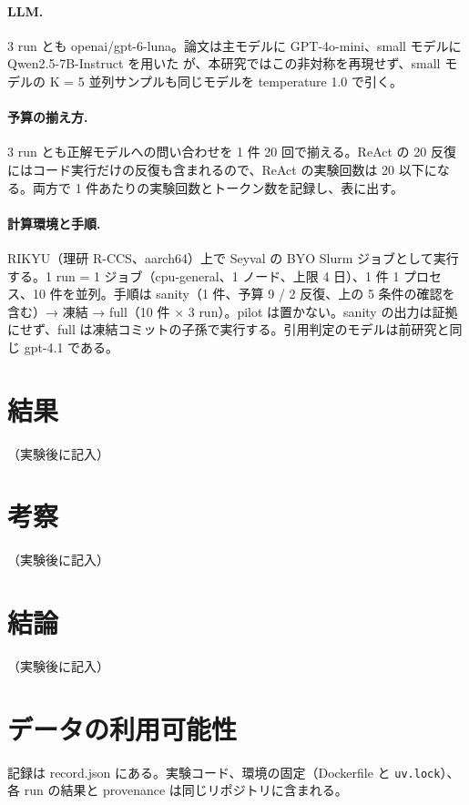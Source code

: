 \documentclass{article}
\providecommand{\airasrecordlink}[1]{#1}
\begin{document}
\paragraph{LLM.}
3 run とも openai/gpt-6-luna。論文は主モデルに GPT-4o-mini、small モデルに Qwen2.5-7B-Instruct を用いた \cite[s2.p4]{kabra-2026-llm} が、本研究ではこの非対称を再現せず、small モデルの K = 5 並列サンプルも同じモデルを temperature 1.0 \cite[s2.p13]{kabra-2026-llm} で引く。

\paragraph{予算の揃え方.}
3 run とも正解モデルへの問い合わせを 1 件 20 回で揃える。ReAct の 20 反復にはコード実行だけの反復も含まれるので、ReAct の実験回数は 20 以下になる。両方で 1 件あたりの実験回数とトークン数を記録し、表に出す。

\paragraph{計算環境と手順.}
RIKYU（理研 R-CCS、aarch64）上で Seyval の BYO Slurm ジョブとして実行する。1 run = 1 ジョブ（cpu-general、1 ノード、上限 4 日）、1 件 1 プロセス、10 件を並列。手順は sanity（1 件、予算 9 / 2 反復、上の 5 条件の確認を含む）→ 凍結 → full（10 件 × 3 run）。pilot は置かない。sanity の出力は証拠にせず、full は凍結コミットの子孫で実行する。引用判定のモデルは前研究と同じ gpt-4.1 である。


\section{結果}
\label{sec:results}
（実験後に記入）

\section{考察}
\label{sec:discussion}
（実験後に記入）

\section{結論}
\label{sec:conclusion}
（実験後に記入）

\section*{データの利用可能性}
記録は \airasrecordlink{record.json} にある。実験コード、環境の固定（Dockerfile と \texttt{uv.lock}）、各 run の結果と provenance は同じリポジトリに含まれる。



\end{document}
